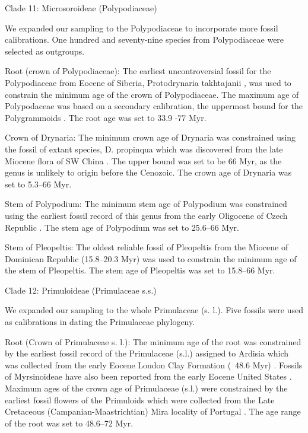 \documentclass[10pt]{article}
\begin{document}
Clade 11: Microsoroideae (Polypodiaceae)

We expanded our sampling to the Polypodiaceae to incorporate more
fossil calibrations. One hundred and seventy-nine species from
Polypodiaceae were selected as outgroups. 

Root (crown of Polypodiaceae): The earliest uncontroversial fossil for
the Polypodiaceae from Eocene of Siberia, Protodrynaria takhtajanii
\citep{Vikulin1987}, was used to constrain the minimum age
of the crown of Polypodiaceae. The maximum age of Polypodaceae was
based on a secondary calibration, the uppermost bound for the
Polygrammoids \citep{Schuettpelz2009}. The root age was set
to 33.9 -77 Myr.

Crown of Drynaria: The minimum crown age of Drynaria was constrained
using the fossil of extant species, D. propinqua which was discovered
from the late Miocene flora of SW China \citep{Wen2013}. The upper
bound was set to be 66 Myr, as the genus is unlikely to origin before
the Cenozoic. The crown age of Drynaria was set to 5.3--66 Myr.

Stem of Polypodium: The minimum stem age of Polypodium was constrained
using the earliest fossil record of this genus from the early
Oligocene of Czech Republic \citep{Kvacek2001}. The stem age of
Polypodium was set to 25.6--66 Myr.

Stem of Pleopeltis: The oldest reliable fossil of Pleopeltis from the
Miocene of Dominican Republic (15.8--20.3 Myr) \citep{Schneider2015}
was used to constrain the minimum age of the stem of Pleopeltis. The
stem age of Pleopeltis was set to 15.8--66 Myr.

Clade 12: Primuloideae (Primulaceae s.s.)

We expanded our sampling to the whole Primulaceae (s. l.). Five
fossils were used as calibrations in dating the Primulaceae
phylogeny. 

Root (Crown of Primulaceae s. l.): The minimum age of the root was
constrained by the earliest fossil record of the Primulaceae (s.l.)
assigned to Ardisia which was collected from the early Eocene London
Clay Formation (~48.6 Myr) \citep{Collinson1984}. Fossils of
Myrsinoideae have also been reported from the early Eocene United
States \citep{Irving1971}. Maximum ages of the crown age of
Primulaceae (s.l.) were constrained by the earliest fossil flowers of
the Primuloids which were collected from the Late Cretaceous
(Campanian-Maastrichtian) Mira locality of Portugal
\citep{Friis2011}. The age range of the root was set to 48.6--72 Myr.
\end{document}
